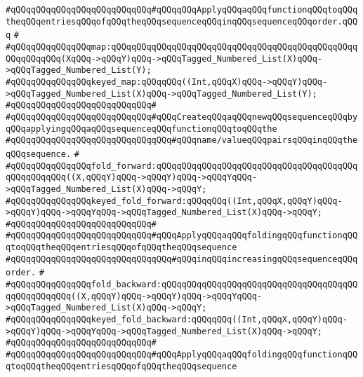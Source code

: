 \verb|#qQQqqQQqqQQqqQQqqQQqqQQqqQQq#qQQqqQQqApplyqQQqaqQQqfunctionqQQqtoqQQqtheqQQqentriesqQQqofqQQqtheqQQqsequenceqQQqinqQQqsequenceqQQqorder.qQQq|\newline
\verb|#|\newline
\verb|#qQQqqQQqqQQqqQQqmap:qQQqqQQqqQQqqQQqqQQqqQQqqQQqqQQqqQQqqQQqqQQqqQQqqQQqqQQqqQQq(XqQQq->qQQqY)qQQq->qQQqTagged_Numbered_List(X)qQQq->qQQqTagged_Numbered_List(Y);|\newline
\verb|#qQQqqQQqqQQqqQQqkeyed_map:qQQqqQQq((Int,qQQqX)qQQq->qQQqY)qQQq->qQQqTagged_Numbered_List(X)qQQq->qQQqTagged_Numbered_List(Y);|\newline
\verb|#qQQqqQQqqQQqqQQqqQQqqQQqqQQq#|\newline
\verb|#qQQqqQQqqQQqqQQqqQQqqQQqqQQq#qQQqCreateqQQqaqQQqnewqQQqsequenceqQQqbyqQQqapplyingqQQqaqQQqsequenceqQQqfunctionqQQqtoqQQqthe|\newline
\verb|#qQQqqQQqqQQqqQQqqQQqqQQqqQQqqQQq#qQQqname/valueqQQqpairsqQQqinqQQqtheqQQqsequence.|\newline
\verb|#|\newline
\verb|#qQQqqQQqqQQqqQQqfold_forward:qQQqqQQqqQQqqQQqqQQqqQQqqQQqqQQqqQQqqQQqqQQqqQQqqQQq((X,qQQqY)qQQq->qQQqY)qQQq->qQQqYqQQq->qQQqTagged_Numbered_List(X)qQQq->qQQqY;|\newline
\verb|#qQQqqQQqqQQqqQQqkeyed_fold_forward:qQQqqQQq((Int,qQQqX,qQQqY)qQQq->qQQqY)qQQq->qQQqYqQQq->qQQqTagged_Numbered_List(X)qQQq->qQQqY;|\newline
\verb|#qQQqqQQqqQQqqQQqqQQqqQQqqQQq#|\newline
\verb|#qQQqqQQqqQQqqQQqqQQqqQQqqQQq#qQQqApplyqQQqaqQQqfoldingqQQqfunctionqQQqtoqQQqtheqQQqentriesqQQqofqQQqtheqQQqsequence|\newline
\verb|#qQQqqQQqqQQqqQQqqQQqqQQqqQQqqQQq#qQQqinqQQqincreasingqQQqsequenceqQQqorder.|\newline
\verb|#|\newline
\verb|#qQQqqQQqqQQqqQQqfold_backward:qQQqqQQqqQQqqQQqqQQqqQQqqQQqqQQqqQQqqQQqqQQqqQQqqQQq((X,qQQqY)qQQq->qQQqY)qQQq->qQQqYqQQq->qQQqTagged_Numbered_List(X)qQQq->qQQqY;|\newline
\verb|#qQQqqQQqqQQqqQQqkeyed_fold_backward:qQQqqQQq((Int,qQQqX,qQQqY)qQQq->qQQqY)qQQq->qQQqYqQQq->qQQqTagged_Numbered_List(X)qQQq->qQQqY;|\newline
\verb|#qQQqqQQqqQQqqQQqqQQqqQQqqQQq#|\newline
\verb|#qQQqqQQqqQQqqQQqqQQqqQQqqQQq#qQQqApplyqQQqaqQQqfoldingqQQqfunctionqQQqtoqQQqtheqQQqentriesqQQqofqQQqtheqQQqsequence|\newline
